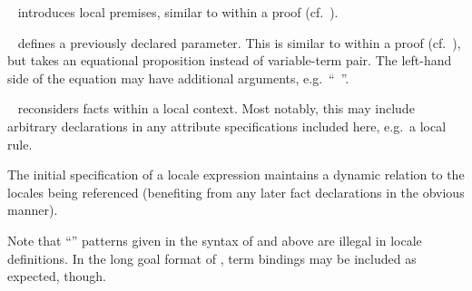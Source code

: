 \begin{isabellebody}
\begin{isamarkuptext}
\begin{description}
\begin{description}
  \item \hyperlink{element.assumes}{\mbox{}}~
  introduces local premises, similar to \hyperlink{command.assume}{\mbox{}} within a
  proof (cf.\ ).

  \item \hyperlink{element.defines}{\mbox{}}~ defines a previously
  declared parameter.  This is similar to \hyperlink{command.def}{\mbox{}} within a
  proof (cf.\ ), but \hyperlink{element.defines}{\mbox{}}
  takes an equational proposition instead of variable-term pair.  The
  left-hand side of the equation may have additional arguments, e.g.\
  ``\hyperlink{element.defines}{\mbox{}}~''.

  \item \hyperlink{element.notes}{\mbox{}}~
  reconsiders facts within a local context.  Most notably, this may
  include arbitrary declarations in any attribute specifications
  included here, e.g.\ a local \hyperlink{attribute.simp}{\mbox{}} rule.

  The initial  specification of a locale expression
  maintains a dynamic relation to the locales being referenced
  (benefiting from any later fact declarations in the obvious manner).

  \end{description}
  
  Note that ``'' patterns given
  in the syntax of \hyperlink{element.assumes}{\mbox{\isa{\isakeyword{assumes}}}} and \hyperlink{element.defines}{\mbox{\isa{\isakeyword{defines}}}} above
  are illegal in locale definitions.  In the long goal format of
  \secref{sec:goals}, term bindings may be included as expected,
  though.
  

\end{description}
\end{isamarkuptext}
\end{isabellebody}
